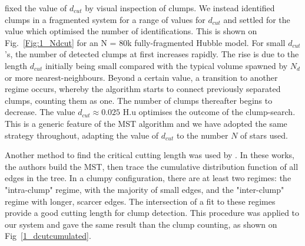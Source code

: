 \cite{Maschberger2010} fixed the value of  $d_{cut}$ by visual inspection of clumps.
 We instead  identified  clumps in a fragmented system for a range of values for $d_{cut}$ and settled for the value  which optimised the number of identifications. This is shown on Fig.~\ref{Fig:1_Ndcut} for an N = 80k fully-fragmented Hubble model. For small $d_{cut}$'s, the number of detected clumps at first  increases rapidly. The rise is due  to the length $d_{cut}$ initially being small compared with the typical volume spawned by $N_d$ or more  nearest-neighbours. Beyond a certain value, a transition to another regime occurs, whereby the algorithm starts to connect previously separated clumps, counting them as one. The number of clumps thereafter begins to decrease. The value $d_{cut} \approx 0.025$ H.u optimises the outcome of the clump-search. This is a generic feature of the MST algorithm and we have adopted the same strategy throughout, adapting the value of $d_{cut}$ to the number $N$ of stars used. 

Another method to find the critical cutting length was used by \cite{Gutermuth2009,Kirk2011}. In these works, the authors build the MST, then trace the cumulative distribution function of all edges in the tree. In a clumpy configuration, there are at least two regimes: the "intra-clump" regime, with the majority of small edges, and the "inter-clump" regime with longer, scarcer edges. The intersection of a fit to these regimes provide a good cutting length for clump detection. This procedure was applied to our system and gave the same result than the clump counting, as shown on Fig~\ref{1_dcutcumulated}.

 


